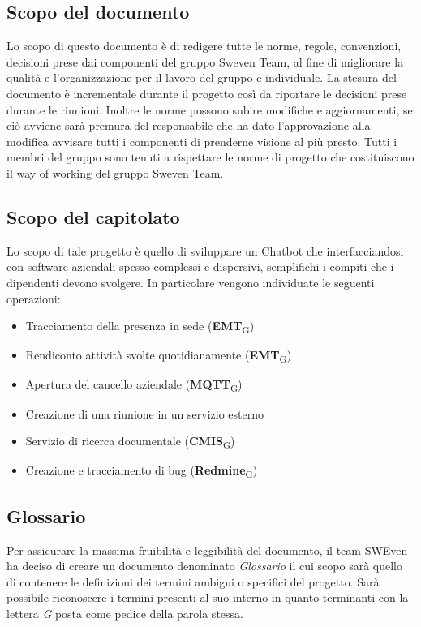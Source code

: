 \subsection{Scopo del documento}
Lo scopo di questo documento è di redigere tutte le norme, regole, convenzioni, decisioni 
prese dai componenti del gruppo Sweven Team, al fine di migliorare la qualità e l'organizzazione
per il lavoro del gruppo e individuale. \newline
La stesura del documento è incrementale durante il progetto così da riportare le decisioni
prese durante le riunioni. Inoltre le norme possono subire modifiche e aggiornamenti,
se ciò avviene sarà premura del responsabile che ha dato l'approvazione alla modifica 
avvisare tutti i componenti di prenderne visione al più presto. \newline 
Tutti i membri del gruppo sono tenuti a rispettare le norme di progetto che costituiscono
il way of working del gruppo Sweven Team.

\subsection{Scopo del capitolato}
Lo scopo di tale progetto è quello di sviluppare un Chatbot che interfacciandosi con software aziendali spesso complessi e dispersivi, semplifichi i compiti che i dipendenti devono svolgere. In particolare vengono individuate le seguenti operazioni: 
\begin{itemize}
	\item Tracciamento della presenza in sede (\textbf{EMT}\textsubscript{G})
	\item Rendiconto attività svolte quotidianamente (\textbf{EMT}\textsubscript{G})
	\item Apertura del cancello aziendale (\textbf{MQTT}\textsubscript{G})
	\item Creazione di una riunione in un servizio esterno
	\item Servizio di ricerca documentale (\textbf{CMIS}\textsubscript{G})
	\item Creazione e tracciamento di bug (\textbf{Redmine}\textsubscript{G})
\end{itemize}

\subsection{Glossario}
Per assicurare la massima fruibilità e leggibilità del documento, il team SWEven ha deciso di creare un documento denominato \textit{Glossario} il cui scopo sarà quello di contenere le definizioni dei termini ambigui o specifici del progetto. Sarà possibile riconoscere i termini presenti al suo interno in quanto terminanti con la lettera \textit{G} posta come pedice della parola stessa. 
